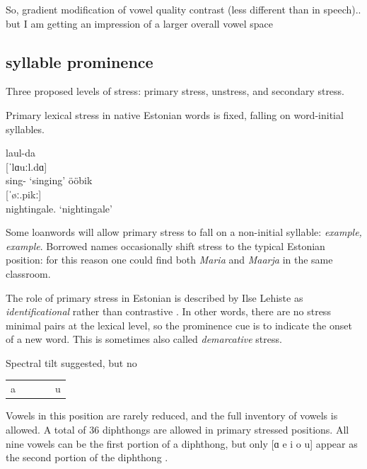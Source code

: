 So, gradient modification of vowel quality contrast (less different than in speech).. but I am getting an impression of a larger overall vowel space


\subsection{syllable prominence}

Three proposed levels of stress: primary stress, unstress, and secondary stress. \citep{lippusAcousticStudyEstonian2014a}

Primary lexical stress in native Estonian words is fixed, falling on word-initial syllables. 
\citep{eekmeisterUralica98}
\begin{exe}
\ex \gll laul-da \\
	{[ˈlɑuːl.dɑ]} \\
	sing-\Tr{} 
	\glt	`singing'
\ex 	ööbik \\
	{[ˈøː.pikː]} \\
	nightingale.\Nom{} 
	\glt`nightingale'
\end{exe}

Some loanwords will allow primary stress to fall on a non-initial syllable: {\it example, example}. 
Borrowed names occasionally shift stress to the typical Estonian position: for this reason one could find both {\it Maria} and {\it Maarja} in the same classroom. 

The role of primary stress in Estonian is described by Ilse Lehiste as {\it identificational} rather than contrastive \citep{lehistePhoneticsMetrics1992}. In other words, there are no stress minimal pairs at the lexical level, so the prominence cue is to indicate the onset of a new word. This is sometimes also called {\it demarcative} stress.

Spectral tilt suggested, but no
\citep{sluijterSpectralBalanceAcoustic1996, lippusAcousticStudyEstonian2014a} \\


\begin{table}
\centering
\begin{tabular}{lcccr}
a & & & & u \\
\end{tabular}
\label{vowelinv} 
\end{table}
Vowels in this position are rarely reduced, and the full inventory of vowels is allowed. A total of 36 diphthongs are allowed in primary stressed positions. All nine vowels can be the first portion of a diphthong, but only [ɑ e i o u] appear as the second portion of the diphthong \citep{asuEstonian2009}. 


